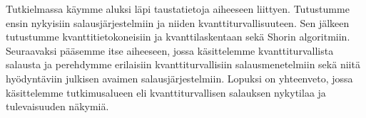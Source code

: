 Tutkielmassa käymme aluksi läpi taustatietoja aiheeseen liittyen. Tutustumme ensin nykyisiin salausjärjestelmiin ja niiden kvanttiturvallisuuteen. Sen jälkeen tutustumme kvanttitietokoneisiin ja kvanttilaskentaan sekä Shorin algoritmiin. Seuraavaksi pääsemme itse aiheeseen, jossa käsittelemme kvanttiturvallista salausta ja perehdymme erilaisiin kvanttiturvallisiin salausmenetelmiin sekä niitä hyödyntäviin julkisen avaimen salausjärjestelmiin. Lopuksi on yhteenveto, jossa käsittelemme tutkimusalueen eli kvanttiturvallisen salauksen nykytilaa ja tulevaisuuden näkymiä.